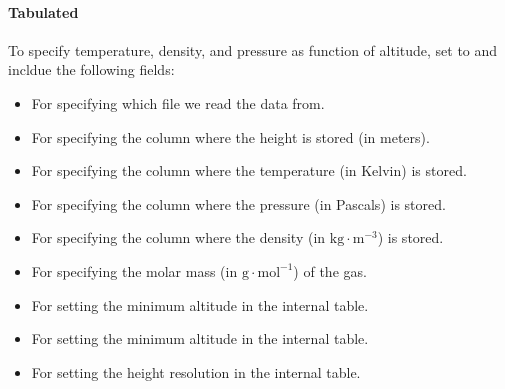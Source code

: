 \documentclass[letterpaper,10pt,english]{sphinxmanual}
\begin{document}
\paragraph{Tabulated}
\label{\detokenize{Applications/CdrPlasmaModel:tabulated}}
\sphinxAtStartPar
To specify temperature, density, and pressure as function of altitude, set  to  and incldue the following fields:
\begin{itemize}
\item {} 
\sphinxAtStartPar
{} For specifying which file we read the data from.

\item {} 
\sphinxAtStartPar
{} For specifying the column where the height is stored (in meters).

\item {} 
\sphinxAtStartPar
{} For specifying the column where the temperature (in Kelvin) is stored.

\item {} 
\sphinxAtStartPar
{} For specifying the column where the pressure (in Pascals) is stored.

\item {} 
\sphinxAtStartPar
{} For specifying the column where the density (in \(\textrm{kg}\cdot\textrm{m}^{-3}\)) is stored.

\item {} 
\sphinxAtStartPar
{} For specifying the molar mass (in \(\textrm{g}\cdot\textrm{mol}^{-1}\)) of the gas.

\item {} 
\sphinxAtStartPar
{} For setting the minimum altitude in the  internal table.

\item {} 
\sphinxAtStartPar
{} For setting the minimum altitude in the  internal table.

\item {} 
\sphinxAtStartPar
{} For setting the height resolution in the  internal table.

\end{itemize}
\end{document}
